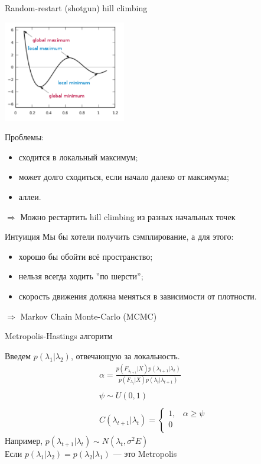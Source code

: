 \documentclass[14pt, fleqn, xcolor={dvipsnames, table}]{beamer}
\begin{document}
\begin{frame}{Random-restart (shotgun) hill climbing}
\begin{center}
\includegraphics[width=0.4\textwidth]{hill_climb.png}
\end{center}
\footnotesize
Проблемы:
\begin{itemize}
  \item сходится в локальный максимум;
  \item может долго сходиться, если начало далеко от максимума;
  \item аллеи.
\end{itemize}
$\Rightarrow$ Можно рестартить hill climbing из разных начальных точек
\end{frame}

\begin{frame}{Интуиция}
Мы бы хотели получить сэмплирование, а для этого:
\begin{itemize}
  \item хорошо бы обойти всё пространство;
  \item нельзя всегда ходить ''по шерсти'';
  \item скорость движения должна меняться в зависимости от плотности.
\end{itemize}
$\Rightarrow$ Markov Chain Monte-Carlo (MCMC)
\end{frame}

\begin{frame}{Metropolis-Hastings алгоритм}

Введем $p(\lambda_1|\lambda_2)$, отвечающую за локальность.
$$\begin{array}{l}
\alpha = \frac{p(F_{\lambda_{t+1}}|X)p(\lambda_{t+1}|\lambda_t)}{p(F_{\lambda_t}|X)p(\lambda_t|\lambda_{t+1})}\\
\\
\psi \sim U(0,1)\\
\\
C(\lambda_{t+1}|\lambda_t) = \left\{  
           \begin{array}{ll}  
            1,& \alpha \ge \psi \\  
            0 &\\  
           \end{array}   
           \right.  
\end{array}$$
Например, $p(\lambda_{t+1}|\lambda_t) \sim N(\lambda_t,\sigma^2E)$ \\
Если $p(\lambda_1 | \lambda_2) = p(\lambda_2 | \lambda_1)$ --- это Metropolis \\ 
\end{frame}
\end{document}
